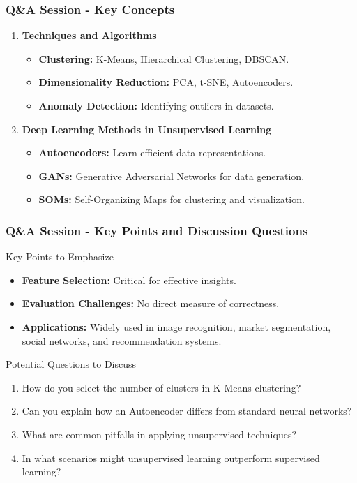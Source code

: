\documentclass[aspectratio=169]{beamer}
\begin{document}
\begin{frame}[fragile]
  \frametitle{Q\&A Session - Key Concepts}
  \begin{enumerate}
    \item \textbf{Techniques and Algorithms}
      \begin{itemize}
        \item \textbf{Clustering:} K-Means, Hierarchical Clustering, DBSCAN.
        \item \textbf{Dimensionality Reduction:} PCA, t-SNE, Autoencoders.
        \item \textbf{Anomaly Detection:} Identifying outliers in datasets.
      \end{itemize}
    
    \item \textbf{Deep Learning Methods in Unsupervised Learning}
      \begin{itemize}
        \item \textbf{Autoencoders:} Learn efficient data representations.
        \item \textbf{GANs:} Generative Adversarial Networks for data generation.
        \item \textbf{SOMs:} Self-Organizing Maps for clustering and visualization.
      \end{itemize}
  \end{enumerate}
  
\end{frame}

\begin{frame}[fragile]
  \frametitle{Q\&A Session - Key Points and Discussion Questions}
  \begin{block}{Key Points to Emphasize}
    \begin{itemize}
      \item \textbf{Feature Selection:} Critical for effective insights.
      \item \textbf{Evaluation Challenges:} No direct measure of correctness.
      \item \textbf{Applications:} Widely used in image recognition, market segmentation, social networks, and recommendation systems.
    \end{itemize}
  \end{block}

  \begin{block}{Potential Questions to Discuss}
    \begin{enumerate}
      \item How do you select the number of clusters in K-Means clustering?
      \item Can you explain how an Autoencoder differs from standard neural networks?
      \item What are common pitfalls in applying unsupervised techniques?
      \item In what scenarios might unsupervised learning outperform supervised learning?
    \end{enumerate}
  \end{block}
  
\end{frame}
\end{document}
